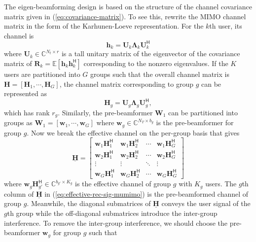 \documentclass[a4paper,12pt]{article}%
\begin{document}
The eigen-beamforming design is based on the structure of the channel covariance matrix given in (\ref{eq:covariance-matrix}). To see this, rewrite the MIMO channel matrix in the form of the Karhunen-Loeve representation. For the $k$th user, its channel is \begin{equation}
\mathbf{h}_k = \mathbf{U}_k \boldsymbol{\Lambda}_k \mathbf{U}_k^\mathsf{H}
\end{equation}
where $\mathbf{U}_k \in \mathbb{C}^{N_t \times r}$ is a tall unitary matrix of the eigenvector of the covariance matrix of $\mathbf{R}_k =\mathbb{E}[\mathbf{h}_k \mathbf{h}_k^\mathsf{H}]$ corresponding to the nonzero eigenvalues. If the $K$ users are partitioned into $G$ groups such that the overall channel matrix is $\mathbf{H}=[\mathbf{H}_1, \cdots, \mathbf{H}_G]$, the channel matrix corresponding to group $g$ can be represented as
\begin{equation}
\mathbf{H}_g = \mathbf{U}_g \boldsymbol{\Lambda}_g \mathbf{U}_g^\mathsf{H},
\end{equation}
which has rank $r_g$. Similarly, the pre-beamformer $\mathbf{W}_1$ can be partitioned into groups as $\mathbf{W}_1=[\mathbf{w}_1, \cdots, \mathbf{w}_G]$ where $\mathbf{w}_g \in \mathbb{C}^{N_T \times b_g}$ is the pre-beamformer for group $g$. Now we break the effective channel on the per-group basis that gives
\begin{equation}
\underline{\mathbf{H}} = \begin{bmatrix} \mathbf{w}_1 \mathbf{H}_1^\mathsf{H} & \mathbf{w}_1 \mathbf{H}_2^\mathsf{H} & \cdots & \mathbf{w}_1 \mathbf{H}_G^\mathsf{H} \\
\mathbf{w}_2 \mathbf{H}_1^\mathsf{H} & \mathbf{w}_2 \mathbf{H}_2^\mathsf{H} & \cdots & \mathbf{w}_2 \mathbf{H}_G^\mathsf{H} \\
\vdots & \vdots & \ddots & \vdots \\
\mathbf{w}_G \mathbf{H}_1^\mathsf{H} & \mathbf{w}_G \mathbf{H}_2^\mathsf{H} & \cdots & \mathbf{w}_G \mathbf{H}_G^\mathsf{H}
\end{bmatrix}
\end{equation}
where $\mathbf{w}_g \mathbf{H}_{g'}^\mathsf{H} \in \mathbb{C}^{b_{g'} \times K_g}$ is the effective channel of group $g$ with $K_g$ users. The $g$th column of $\underline{\mathbf{H}}$ in (\ref{eq:effective-rec-sig-mumimo})  is the pre-beamformed channel of group $g$. Meanwhile, the diagonal submatrices of $\underline{\mathbf{H}}$ conveys the user signal of the $g$th group while the off-diagonal submatrices introduce the inter-group interference. To remove the inter-group interference, we should choose the pre-beamformer $\mathbf{w}_g$ for group $g$ such that
\end{document}
